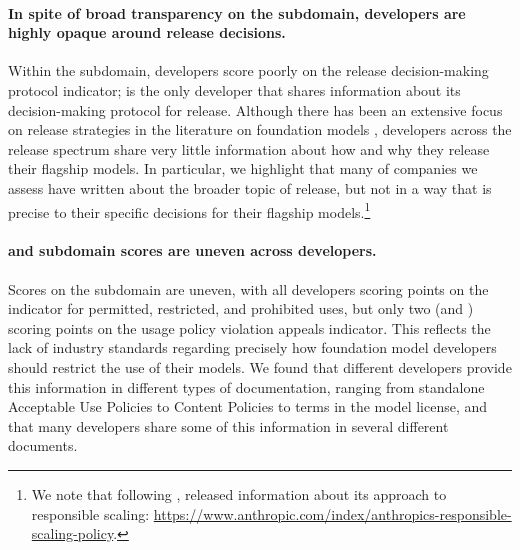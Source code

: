 \paragraph{In spite of broad transparency on the \distribution subdomain, developers are highly opaque around release decisions.}
Within the \distribution subdomain, developers score poorly on the release decision-making protocol indicator; \huggingface is the only developer that shares information about its decision-making protocol for release.
Although there has been an extensive focus on release strategies in the literature on foundation models \citep{solaiman2019release, sastry2021release, shevlane2022structured, liang2022community-norms, liang2022condemning, solaiman2023gradient, widder2023open, seger2023open}, developers across the release spectrum share very little information about how and why they release their flagship models. 
In particular, we highlight that many of companies we assess have written about the broader topic of release, but not in a way that is precise to their specific decisions for their flagship models.\footnote{We note that following \informationfreezedate, \anthropic released information about its approach to responsible scaling: \url{https://www.anthropic.com/index/anthropics-responsible-scaling-policy}.}

\paragraph{\usagepolicy and \modelbehaviorpolicy subdomain scores are uneven across developers.}
Scores on the \usagepolicy subdomain are uneven, with all developers scoring points on the indicator for permitted, restricted, and prohibited uses, but only two (\openai and \inflection) scoring points on the usage policy violation appeals indicator.
This reflects the lack of industry standards regarding precisely how foundation model developers should restrict the use of their models. 
We found that different developers provide this information in different types of documentation, ranging from standalone Acceptable Use Policies to Content Policies to terms in the model license, and that many developers share some of this information in several different documents. 

